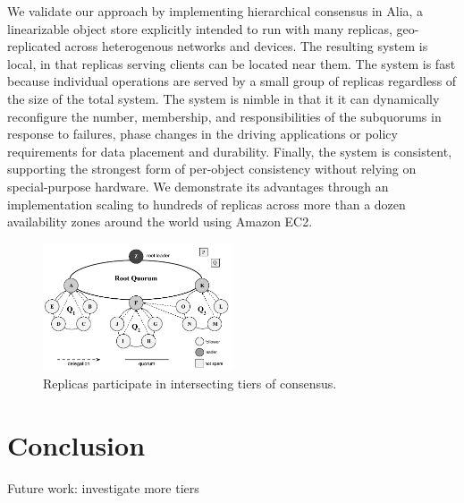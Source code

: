 \documentclass[11pt,conference]{IEEEtran}
\newcommand{\hc}{hierarchical consensus\xspace}
\begin{document}
We validate our approach by implementing \hc in Alia, a linearizable object store
explicitly intended to run with many replicas, geo-replicated across heterogenous
networks and devices.
The resulting system is local, in that replicas serving clients can be located near them.
The system is fast because individual operations are served by a small group of replicas
regardless of the size of the total system.
The system is nimble in that it it can dynamically reconfigure the number, membership,
and responsibilities of the subquorums in response to failures, phase changes in the
driving applications or policy requirements for data placement and durability.
Finally, the system is consistent, supporting the strongest form of per-object
consistency without relying on special-purpose hardware.
We demonstrate its advantages through an implementation scaling to hundreds of replicas
across more than a dozen availability zones around the world using Amazon EC2.



\begin{figure}[t]
    \centering
    \includegraphics[width=0.5\textwidth]{figures/election3}
    \caption{Replicas participate in intersecting tiers of consensus.}
    \label{fig:system}
\end{figure}


\section{Conclusion}



Future work: investigate more tiers



\end{document}
